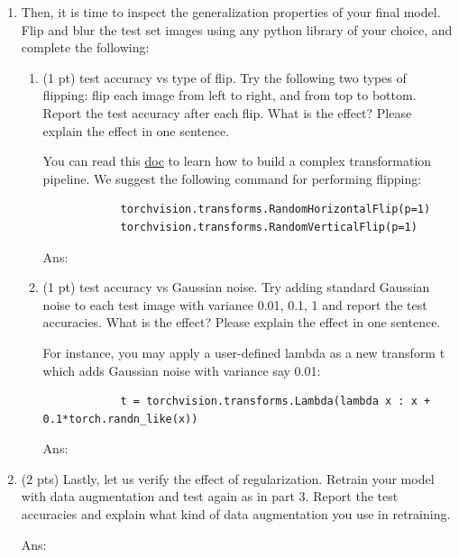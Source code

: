 \documentclass[10pt,letter,notitlepage]{article}
\newcommand{\red}[1]{{\color{red}#1}}
\newcommand{\magenta}[1]{{\color{magenta}#1}}
\newcommand{\ans}[1]{{\color{orange}\textsf{Ans}: #1}}
\newcounter{exercise}
\begin{document}
\begin{exercise}
\begin{enumerate}
		\ans{}
		
		\item Then, it is time to inspect the generalization properties of your final model. Flip and blur the \red{test set images} using any python library of your choice, and complete the following:		
		\begin{enumerate}[resume]
			\item (1 pt) test accuracy vs type of flip. Try the following two types of flipping: flip each image from left to right, and from top to bottom. Report the test accuracy after each flip. What is the effect? Please explain the effect in one sentence.
			
			You can read this \href{https://pytorch.org/vision/stable/transforms.html}{\magenta{doc}} to learn how to build a complex transformation pipeline. We suggest the following command for performing flipping: 
			\begin{verbatim}
			torchvision.transforms.RandomHorizontalFlip(p=1)
			torchvision.transforms.RandomVerticalFlip(p=1)
			\end{verbatim}
			
			\ans{}
			
			\item (1 pt) test accuracy vs Gaussian noise. Try adding standard Gaussian noise to each test image with variance 0.01, 0.1, 1 and report the test accuracies. What is the effect? Please explain the effect in one sentence.
			
			For instance, you may apply a user-defined lambda as a new transform t which adds Gaussian noise with variance say 0.01: 
			\begin{verbatim}
			t = torchvision.transforms.Lambda(lambda x : x + 0.1*torch.randn_like(x))
			\end{verbatim}
			
			\ans{}
		\end{enumerate} 
		
		\item (2 pts) Lastly, let us verify the effect of regularization. Retrain your model with data augmentation and test again as in part 3. Report the test accuracies and explain what kind of data augmentation you use in retraining.
		
		\ans{}
		
	\end{enumerate}
	
\end{exercise}
\end{document}
